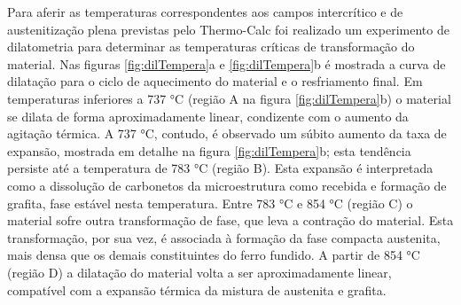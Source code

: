 Para aferir as temperaturas correspondentes aos campos intercrítico e de austenitização plena previstas pelo Thermo-Calc\textregistered{} foi realizado um experimento de dilatometria para determinar as temperaturas críticas de transformação do material. Nas figuras \ref{fig:dilTempera}a e \ref{fig:dilTempera}b é mostrada a curva de dilatação para o ciclo de aquecimento do material e o resfriamento final. Em temperaturas inferiores a 737 °C (região A na figura \ref{fig:dilTempera}b) o material se dilata de forma aproximadamente linear, condizente com o aumento da agitação térmica. A 737 °C, contudo, é observado um súbito aumento da taxa de expansão, mostrada em detalhe na figura \ref{fig:dilTempera}b; esta tendência persiste até a temperatura de 783 °C (região B). Esta expansão é interpretada como a dissolução de carbonetos da microestrutura como recebida e formação de grafita, fase estável nesta temperatura. Entre 783 °C e 854 °C (região C) o material sofre outra transformação de fase, que leva a contração do material. Esta transformação, por sua vez, é associada à formação da fase compacta austenita, mais densa que os demais constituintes do ferro fundido. A partir de 854 °C (região D) a dilatação do material volta a ser aproximadamente linear, compatível com a expansão térmica da mistura de austenita e grafita.

